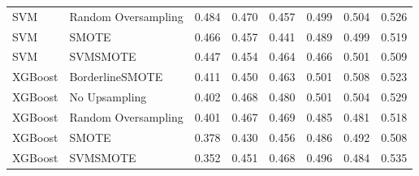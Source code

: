 \begin{tabular}{llllllll}
                         SVM & Random Oversampling & 0.484 &                     0.470 &                 0.457 &                  0.499 &                                   0.504 &     0.526 \\
                         SVM &               SMOTE & 0.466 &                     0.457 &                 0.441 &                  0.489 &                                   0.499 &     0.519 \\
                         SVM &            SVMSMOTE & 0.447 &                     0.454 &                 0.464 &                  0.466 &                                   0.501 &     0.509 \\
                     XGBoost &     BorderlineSMOTE & 0.411 &                     0.450 &                 0.463 &                  0.501 &                                   0.508 &     0.523 \\
                     XGBoost &       No Upsampling & 0.402 &                     0.468 &                 0.480 &                  0.501 &                                   0.504 &     0.529 \\
                     XGBoost & Random Oversampling & 0.401 &                     0.467 &                 0.469 &                  0.485 &                                   0.481 &     0.518 \\
                     XGBoost &               SMOTE & 0.378 &                     0.430 &                 0.456 &                  0.486 &                                   0.492 &     0.508 \\
                     XGBoost &            SVMSMOTE & 0.352 &                     0.451 &                 0.468 &                  0.496 &                                   0.484 &     0.535 \\
\bottomrule
\end{tabular}
